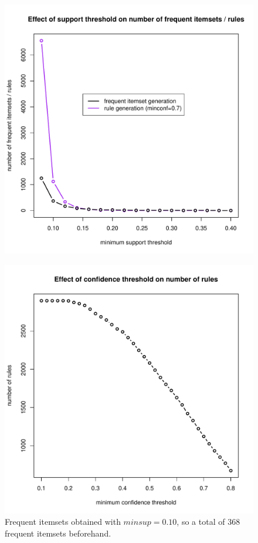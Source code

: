 \documentclass[a4paper,12pt]{article}
\begin{document}
\begin{figure}[H]
  \centering
  \includegraphics[scale=0.80]{plot2.pdf}
\end{figure}

\begin{figure}[H]
  \centering
  \includegraphics[scale=0.80]{plot3.pdf}
  \caption{Frequent itemsets obtained with $minsup = 0.10$, so a total of 368
  frequent itemsets beforehand.}
\end{figure}
\end{document}
